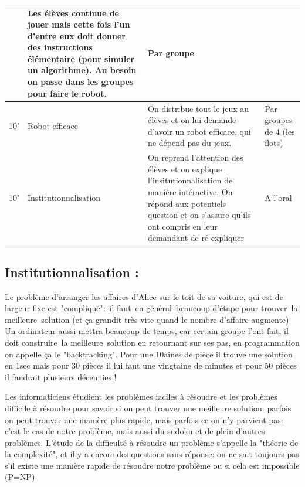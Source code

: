 \documentclass[12pt, a4paper]{article}
\begin{document}
\begin{longtable}{c|m{3.9cm}|m{8.4cm}|m{2.4cm}}
		& 
		
		Les élèves continue de jouer mais cette fois l'un d'entre eux doit donner des instructions élémentaire (pour simuler un algorithme). Au besoin on passe dans les groupes pour faire le robot.
		
		& Par groupe
		
		\\  \hline
		
		10'
		
		&
		
		Robot efficace
		
		&
		
		On distribue tout le jeux au élèves et on lui demande d'avoir un robot efficace, qui ne dépend pas du jeux.
		
		& 
		
		Par groupes de 4 (les îlots)
		
		\\ \hline
		
		10'
		
		&
		
		Institutionnalisation
		
		&
		
		On reprend l'attention des élèves et on explique l'insitutionnalisation de manière intéractive. On répond aux potentiels question et on s'assure qu'ils ont compris en leur demandant de ré-expliquer
		
		&
		
		A l'oral
		
	\end{longtable}
	
\newpage
	
\subsection*{Institutionnalisation :}

Le problème d'arranger les affaires d'Alice sur le toit de sa voiture, qui est de largeur fixe est "compliqué": il faut en général beaucoup d'étape pour trouver la meilleure solution (et ça grandit très vite quand le nombre d'affaire augmente)
Un ordinateur aussi mettra beaucoup de temps, car certain groupe l'ont fait, il doit construire la meilleure solution en retournant sur ses pas, en programmation on appelle ça le "backtracking".
Pour une 10aines de pièce il trouve une solution en 1sec mais pour 30 pièces il lui faut une vingtaine de minutes et pour 50 pièces il faudrait plusieurs décennies !

Les informaticiens étudient les problèmes faciles à résoudre et les problèmes difficile à résoudre pour savoir si on peut trouver une meilleure solution: parfois on peut trouver une manière plus rapide, mais parfois ce on n'y parvient pas: c'est le cas de notre problème, mais aussi du sudoku et de plein d'autres problèmes.
L'étude de la difficulté à résoudre un problème s'appelle la "théorie de la complexité", et il y a encore des questions sans réponse: on ne sait toujours pas s'il existe une manière rapide de résoudre notre problème ou si cela est impossible (P=NP)
\end{document}
